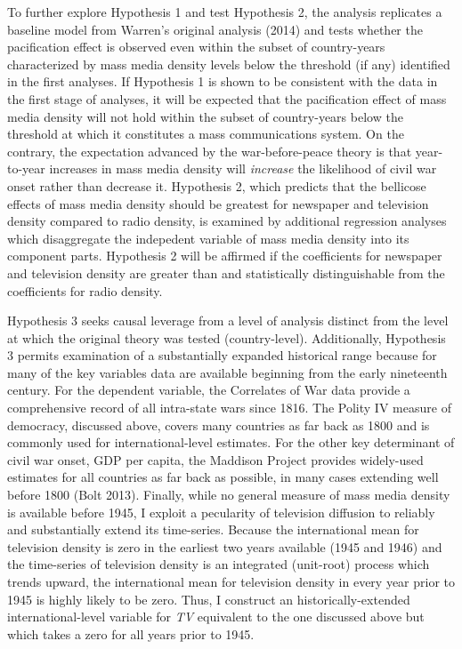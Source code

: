 \documentclass[11pt,article,oneside]{memoir}
\begin{document}
To further explore Hypothesis 1 and test Hypothesis 2, the analysis
replicates a baseline model from Warren's original analysis (2014) and
tests whether the pacification effect is observed even within the subset
of country-years characterized by mass media density levels below the
threshold (if any) identified in the first analyses. If Hypothesis 1 is
shown to be consistent with the data in the first stage of analyses, it
will be expected that the pacification effect of mass media density will
not hold within the subset of country-years below the threshold at which
it constitutes a mass communications system. On the contrary, the
expectation advanced by the war-before-peace theory is that year-to-year
increases in mass media density will \emph{increase} the likelihood of
civil war onset rather than decrease it. Hypothesis 2, which predicts
that the bellicose effects of mass media density should be greatest for
newspaper and television density compared to radio density, is examined
by additional regression analyses which disaggregate the indepedent
variable of mass media density into its component parts. Hypothesis 2
will be affirmed if the coefficients for newspaper and television
density are greater than and statistically distinguishable from the
coefficients for radio density.

Hypothesis 3 seeks causal leverage from a level of analysis distinct
from the level at which the original theory was tested (country-level).
Additionally, Hypothesis 3 permits examination of a substantially
expanded historical range because for many of the key variables data are
available beginning from the early nineteenth century. For the dependent
variable, the Correlates of War data provide a comprehensive record of
all intra-state wars since 1816. The Polity IV measure of democracy,
discussed above, covers many countries as far back as 1800 and is
commonly used for international-level estimates. For the other key
determinant of civil war onset, GDP per capita, the Maddison Project
provides widely-used estimates for all countries as far back as
possible, in many cases extending well before 1800 (Bolt 2013). Finally,
while no general measure of mass media density is available before 1945,
I exploit a pecularity of television diffusion to reliably and
substantially extend its time-series. Because the international mean for
television density is zero in the earliest two years available (1945 and
1946) and the time-series of television density is an integrated
(unit-root) process which trends upward, the international mean for
television density in every year prior to 1945 is highly likely to be
zero. Thus, I construct an historically-extended international-level
variable for \emph{TV} equivalent to the one discussed above but which
takes a zero for all years prior to 1945.
\end{document}
